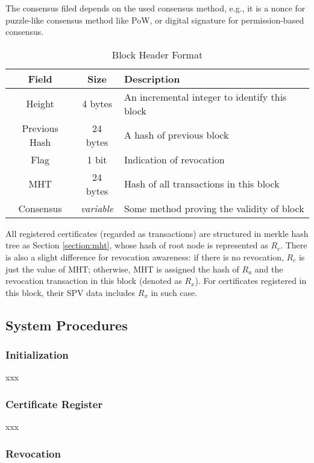 \documentclass[conference]{IEEEtran}
\begin{document}
The consensus filed depends on the used consensus method, e.g., it is a nonce for puzzle-like consensus method like PoW, or digital signature for permission-based consensus.


\begin{table}[h] 
	\caption{Block Header Format}\label{table:format}
	\centering
	\begin{tabular}{c|c|l}
		\hline
		Field & Size & Description \\
		\hline
		Height & 4 bytes & An incremental integer to identify this block \\
		Previous Hash & 24 bytes & A hash of previous block \\
		Flag & 1 bit & Indication of revocation \\
		MHT & 24 bytes & Hash of all transactions in this block \\
		Consensus & \textit{variable} & Some method proving the validity of block\\
		\hline
	\end{tabular}
\end{table}

All registered certificates (regarded as transactions) are structured in merkle hash tree as Section \ref{section:mht}, whose hash of root node is represented as $R_c$. There is also a slight difference for revocation awareness: if there is no revocation, $R_c$ is just the value of MHT; otherwise, MHT is assigned the hash of $R_a$ and the revocation transaction in this block (denoted as $R_x$). For certificates registered in this block, their SPV data includes $R_x$ in such case.


\subsection{System Procedures}
\subsubsection{Initialization}
xxx

\subsubsection{Certificate Register}
xxx


\subsubsection{Revocation}
\end{document}
